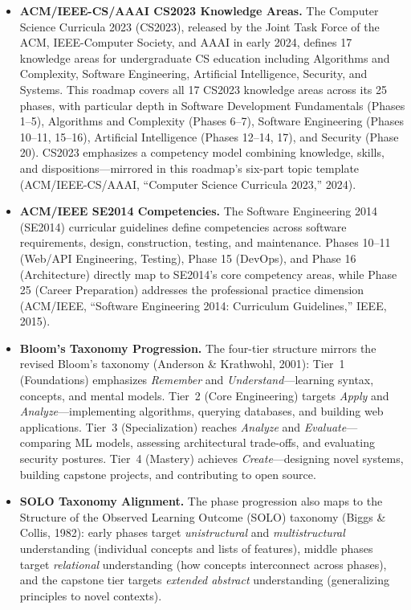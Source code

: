 \documentclass[11pt, a4paper, oneside]{report}
\begin{document}
\begin{itemize}[leftmargin=*]
\item \textbf{ACM/IEEE-CS/AAAI CS2023 Knowledge Areas.} The Computer Science Curricula 2023 (CS2023), released by the Joint Task Force of the ACM, IEEE-Computer Society, and AAAI in early 2024, defines 17 knowledge areas for undergraduate CS education including Algorithms and Complexity, Software Engineering, Artificial Intelligence, Security, and Systems. This roadmap covers all 17 CS2023 knowledge areas across its 25 phases, with particular depth in Software Development Fundamentals (Phases 1--5), Algorithms and Complexity (Phases 6--7), Software Engineering (Phases 10--11, 15--16), Artificial Intelligence (Phases 12--14, 17), and Security (Phase 20). CS2023 emphasizes a competency model combining knowledge, skills, and dispositions---mirrored in this roadmap's six-part topic template (ACM/IEEE-CS/AAAI, ``Computer Science Curricula 2023,'' 2024).

\item \textbf{ACM/IEEE SE2014 Competencies.} The Software Engineering 2014 (SE2014) curricular guidelines define competencies across software requirements, design, construction, testing, and maintenance. Phases 10--11 (Web/API Engineering, Testing), Phase 15 (DevOps), and Phase 16 (Architecture) directly map to SE2014's core competency areas, while Phase 25 (Career Preparation) addresses the professional practice dimension (ACM/IEEE, ``Software Engineering 2014: Curriculum Guidelines,'' IEEE, 2015).

\item \textbf{Bloom's Taxonomy Progression.} The four-tier structure mirrors the revised Bloom's taxonomy (Anderson \& Krathwohl, 2001): Tier~1 (Foundations) emphasizes \emph{Remember} and \emph{Understand}---learning syntax, concepts, and mental models. Tier~2 (Core Engineering) targets \emph{Apply} and \emph{Analyze}---implementing algorithms, querying databases, and building web applications. Tier~3 (Specialization) reaches \emph{Analyze} and \emph{Evaluate}---comparing ML models, assessing architectural trade-offs, and evaluating security postures. Tier~4 (Mastery) achieves \emph{Create}---designing novel systems, building capstone projects, and contributing to open source.

\item \textbf{SOLO Taxonomy Alignment.} The phase progression also maps to the Structure of the Observed Learning Outcome (SOLO) taxonomy (Biggs \& Collis, 1982): early phases target \emph{unistructural} and \emph{multistructural} understanding (individual concepts and lists of features), middle phases target \emph{relational} understanding (how concepts interconnect across phases), and the capstone tier targets \emph{extended abstract} understanding (generalizing principles to novel contexts).


\end{itemize}
\end{document}
